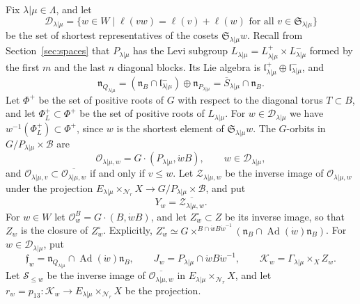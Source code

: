 \documentclass[11pt,a4paper]{amsart}
\theoremstyle{definition}
\theoremstyle{remark}
\newcommand{\N}{\mathcal N}
\newcommand{\B}{\mathcal B}
\newcommand{\Ad}{\operatorname{Ad}}
\newcommand{\lm}{\lambda|\mu}
\numberwithin{equation}{section}
\begin{document}
Fix $\lm\in\Lambda$, and let
$$
\mathcal D_{\lm}=\{w\in W \mid
\ell(vw)=\ell(v)+\ell(w)\text{ for all }v\in\mathfrak S_{\lm}\}
$$
be the set of shortest representatives of the cosets $\mathfrak S_{\lm}w$.
Recall from Section~\ref{sec:spaces} that $P_{\lm}$ has the Levi subgroup
$L_{\lm}=L_{\lm}^+\times L_{\lm}^-$ formed by the first $m$ and the last $n$
diagonal blocks. Its Lie algebra is
$\mathfrak l_{\lm}^+\oplus\mathfrak l_{\lm}^-$, and
$$
\mathfrak n_{Q_{\lm}}=(\mathfrak n_B\cap\mathfrak l_{\lm}^-)\oplus
\mathfrak n_{P_{\lm}}=\overline S_{\lm}\cap\mathfrak n_B .
$$
Let $\Phi^+$ be the set of positive roots of $G$ with respect to the
diagonal torus $T\subset B$, and let $\Phi_L^+\subset\Phi^+$ be the set of
positive roots of $L_{\lm}$. For $w\in\mathcal D_{\lm}$ we have
$w^{-1}(\Phi_L^+)\subset\Phi^+$, since $w$ is the shortest element of
$\mathfrak S_{\lm}w$. The $G$-orbits in $G/P_{\lm}\times\B$ are
$$
\mathcal O_{\lm,w}=G\cdot(P_{\lm},\dot wB),\qquad w\in\mathcal D_{\lm},
$$
and $\mathcal O_{\lm,v}\subset\overline{\mathcal O_{\lm,w}}$ if and only if
$v\le w$. Let $\mathscr Z_{\lm,w}$ be the inverse image of
$\mathcal O_{\lm,w}$ under the projection
$E_{\lm}\times_{\N_r}X\to G/P_{\lm}\times\B$, and put
$$
Y_w=\overline{\mathscr Z_{\lm,w}}.
$$
For $w\in W$ let $\mathcal O^B_w=G\cdot(B,\dot wB)$, and let
$Z_w^\circ\subset Z$ be its inverse image, so that $Z_w$ is the closure of
$Z_w^\circ$. Explicitly,
$Z_w^\circ\simeq G\times^{B\cap\dot wB\dot w^{-1}}
(\mathfrak n_B\cap\Ad(\dot w)\mathfrak n_B)$. For $w\in\mathcal D_{\lm}$, put
$$
\mathfrak f_w=\mathfrak n_{Q_{\lm}}\cap\Ad(\dot w)\mathfrak n_B,\qquad
J_w=P_{\lm}\cap\dot wB\dot w^{-1},\qquad
\mathscr K_w=\Gamma_{\lm}\times_XZ_w .
$$
Let $\mathscr S_{\le w}$ be the inverse image of
$\overline{\mathcal O_{\lm,w}}$ in $E_{\lm}\times_{\N_r}X$, and let
$r_w=p_{13}:\mathscr K_w\to E_{\lm}\times_{\N_r}X$ be the projection.
\end{document}
